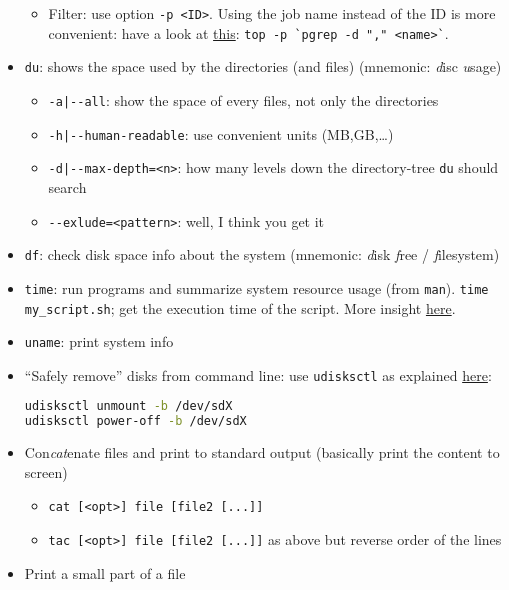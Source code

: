 \documentclass[a4paper,12pt,%
              final%
              ]{article}
\begin{document}
\begin{itemize}
\begin{itemize}
      \item Filter: use option \verb|-p <ID>|. Using the job name instead of the ID is more convenient: have a look at \href{https://unix.stackexchange.com/a/347544}{this}: \verb|top -p `pgrep -d "," <name>`|.
    \end{itemize}
  \item \texttt{du}: shows the space used by the directories (and files) (mnemonic: \emph{d}isc \emph{u}sage)
    \begin{itemize}
      \item \verb!-a|--all!: show the space of every files, not only the directories
      \item \verb!-h|--human-readable!: use convenient units (MB,GB,\ldots)
      \item \verb!-d|--max-depth=<n>!: how many levels down the directory-tree \texttt{du} should search
      \item \verb|--exlude=<pattern>|: well, I think you get it
    \end{itemize}
  \item \texttt{df}: check disk space info about the system (mnemonic: \emph{d}isk \emph{f}ree / \emph{f}ilesystem)
  \item \texttt{time}: run programs and summarize system resource usage (from \texttt{man}). \verb|time my_script.sh|; get the execution time of the script. More insight \href{https://stackoverflow.com/questions/556405/what-do-real-user-and-sys-mean-in-the-output-of-time1/556411#556411}{here}.
  \item \texttt{uname}: print system info
  \item ``Safely remove'' disks from command line: use \texttt{udisksctl} as explained \href{https://askubuntu.com/questions/532586/what-is-the-command-line-equivalent-of-safely-remove-drive}{here}:
\begin{lstlisting}[language=bash]
udisksctl unmount -b /dev/sdX
udisksctl power-off -b /dev/sdX
\end{lstlisting}
  \item Con\emph{cat}enate files and print to standard output (basically print the content to screen)
    \begin{itemize}
      \item \verb|cat [<opt>] file [file2 [...]]|
      \item \verb|tac [<opt>] file [file2 [...]]| as above but reverse order of the lines
    \end{itemize}
  \item Print a small part of a file

\end{itemize}
\end{document}
